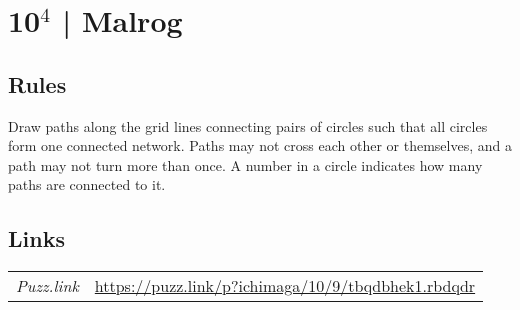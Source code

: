 \section{10$^4$ | {\normalfont Malrog}}
\label{sec:11-10-4-malrog}

\subsection*{Rules}
\begin{markdown}
Draw paths along the grid lines connecting pairs of circles such that all circles form one connected network. Paths may not cross each other or themselves, and a path may not turn more than once. A number in a circle indicates how many paths are connected to it.
\end{markdown}
\subsection*{Links}
\begin{tabularx}{\textwidth}{l X}
\emph{Puzz.link} & \url{https://puzz.link/p?ichimaga/10/9/tbqdbhek1.rbdqdr} \\
\end{tabularx}
\pagebreak
